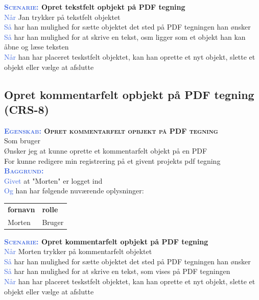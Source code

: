 \textbf{\textsc{\textcolor{RoyalBlue}{Scenarie:}} Opret tekstfelt opbjekt på PDF tegning}\\
\textcolor{RoyalBlue}{Når} Jan trykker på tekstfelt objektet\\
\textcolor{RoyalBlue}{Så}  har han mulighed for sætte objektet det sted på PDF tegningen han ønsker\\
\textcolor{RoyalBlue}{Så}  har han mulighed for at skrive en tekst, osm ligger som et objekt han kan åbne og læse teksten\\
\textcolor{RoyalBlue}{Når} han har placeret teskstfelt objektet, kan han oprette et nyt objekt, slette et objekt eller vælge at afslutte \\

\subsection{Opret kommentarfelt opbjekt på PDF tegning (CRS-8)} \label{sec:USOpretKommentarfelt}
\textbf{\textsc{\textcolor{RoyalBlue}{Egenskab:} Opret kommentarfelt opbjekt på PDF tegning}}\\
Som bruger\\
Ønsker jeg at kunne oprette et kommentarfelt objekt på en PDF\\
For kunne redigere min registrering på et givent projekts pdf tegning\\

\textsc{\textcolor{RoyalBlue}{\textbf{Baggrund:}}}\\
\textcolor{RoyalBlue}{Givet} at "Morten" er logget ind\\
\textcolor{RoyalBlue}{Og} han har følgende nuværende oplysninger:\\
\begin{tabular}{| l | l |}
	\textbf{fornavn} & \textbf{rolle} \\
	Morten & Bruger\\
\end{tabular}

\textbf{\textsc{\textcolor{RoyalBlue}{Scenarie:}} Opret kommentarfelt opbjekt på PDF tegning}\\
\textcolor{RoyalBlue}{Når} Morten trykker på kommentarfelt objektet\\
\textcolor{RoyalBlue}{Så}  har han mulighed for sætte objektet det sted på PDF tegningen han ønsker\\
\textcolor{RoyalBlue}{Så}  har han mulighed for at skrive en tekst, som vises på PDF tegningen\\
\textcolor{RoyalBlue}{Når} han har placeret teskstfelt objektet, kan han oprette et nyt objekt, slette et objekt eller vælge at afslutte \\

